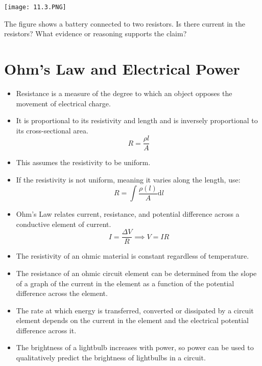 \documentclass[../em.tex]{subfiles}
\begin{document}
\ex 
\begin{center}
    \texttt{[image: 11.3.PNG]}
\end{center}
The figure shows a battery connected to two resistors. Is there current in the resistors? What evidence or reasoning supports the claim?

\pagebreak
\section{Ohm's Law and Electrical Power}
\begin{itemize}
    \item Resistance is a measure of the degree to which an object opposes the movement of electrical charge.
    \item It is proportional to its resistivity and length and is inversely proportional to its cross-sectional area.
    \[R=\frac{\rho l}{A}\]
    \item This assumes the resistivity to be uniform.
    
    \item If the resistivity is not uniform, meaning it varies along the length, use:
    \[R=\int{\frac{\rho(l)}{A}}\mathrm{d}l\]

    \item Ohm's Law relates current, resistance, and potential difference across a conductive element of current.
    \[I=\frac{\Delta V}{R}\implies V = IR\]

    \item The resistivity of an ohmic material is constant regardless of temperature.
    
    \item The resistance of an ohmic circuit element can be determined from the slope of a graph of the current in the element as a function of the potential difference across the element.
    \item The rate at which energy is transferred, converted or dissipated by a circuit element depends on the current in the element and the electrical potential difference across it.
    \item The brightness of a lightbulb increases with power, so power can be used to qualitatively predict the brightness of lightbulbs in a circuit.
\end{itemize}
\end{document}
